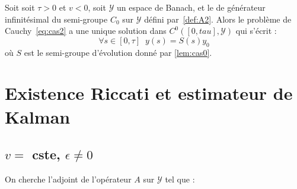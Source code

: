\documentclass[a4paper]{article}
\begin{document}
\begin{theoreme}
	Soit soit $\tau>0$ et $v<0$,
	soit $\mathscr{Y}$ un espace de Banach, et le  
	de générateur infinitésimal du semi-groupe $C_0$ sur $\mathscr{Y}$
	défini par~\eqref{def:A2}.
	Alors le problème de Cauchy~\eqref{eq:cas2} a une unique solution dans $C^0([0,tau],\mathscr{Y})$ qui s'écrit :
	\[ \forall s\in[0,\tau] \; \; y(s) = S(s)y_0 \]
	où $S$ est le semi-groupe d'évolution donné par \ref{lem:cas0}.
\end{theoreme}





\newpage
\section{Existence Riccati et estimateur de Kalman}


\subsection{$v =$ cste, $\epsilon \ne 0$}

On cherche l'adjoint de l'opérateur $A$ sur $\mathscr{Y}$ tel que :
\end{document}
